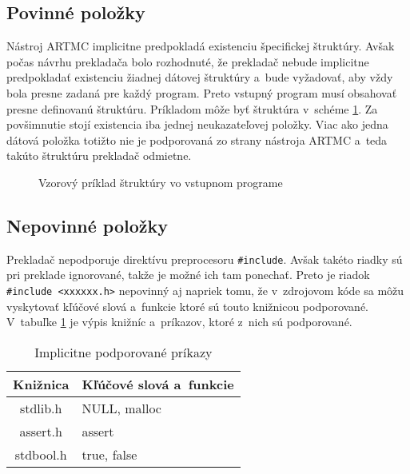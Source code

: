 \subsection{Povinné položky}
Nástroj ARTMC implicitne predpokladá existenciu špecifickej štruktúry. Avšak počas návrhu prekladača bolo rozhodnuté, že prekladač nebude implicitne predpokladať existenciu žiadnej dátovej štruktúry a~bude vyžadovať, aby vždy bola presne zadaná pre každý program. Preto vstupný program musí obsahovať presne definovanú štruktúru. Príkladom môže byť štruktúra v~schéme \ref{fig:struct}. Za povšimnutie stojí existencia iba jednej neukazateľovej položky. Viac ako jedna dátová položka totižto nie je podporovaná zo strany nástroja ARTMC a~teda takúto štruktúru prekladač odmietne.
\begin{center}
\begin{figure}[H]
\label{fig:struct}
\caption{Vzorový príklad štruktúry vo vstupnom programe}
\end{figure}
\end{center}

\subsection{Nepovinné položky}
Prekladač nepodporuje direktívu preprocesoru \texttt{\#include}. Avšak takéto riadky sú pri preklade ignorované, takže je možné ich tam ponechať. Preto je riadok \texttt{\#include <xxxxxx.h>} nepovinný aj napriek tomu, že v~zdrojovom kóde sa môžu vyskytovať kľúčové slová a~funkcie ktoré sú touto knižnicou podporované. V~tabuľke \ref{table:kniz} je výpis knižníc a~príkazov, ktoré z~nich sú podporované.

\begin{table}[H]
\centering
\begin{tabular}{c|l}
\textbf{Knižnica} & \textbf{Kľúčové slová a~funkcie} \\ \hline
stdlib.h          & NULL, malloc                      \\
assert.h          & assert                            \\
stdbool.h         & true, false                       \\
\end{tabular}
\caption{Implicitne podporované príkazy}
\label{table:kniz}
\end{table}


